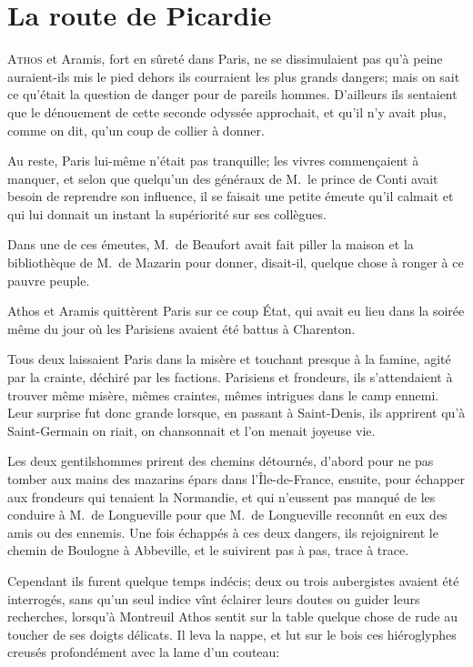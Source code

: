 \chapter{La route de Picardie}

\lettrine{A}{thos} et Aramis, fort en sûreté dans Paris, ne se dissimulaient pas qu'à peine auraient-ils mis le pied dehors ils courraient les plus grands dangers; mais on sait ce qu'était la question de danger pour de pareils hommes. D'ailleurs ils sentaient que le dénouement de cette seconde odyssée approchait, et qu'il n'y avait plus, comme on dit, qu'un coup de collier à donner.

Au reste, Paris lui-même n'était pas tranquille; les vivres commençaient à manquer, et selon que quelqu'un des généraux de M.~le prince de Conti avait besoin de reprendre son influence, il se faisait une petite émeute qu'il calmait et qui lui donnait un instant la supériorité sur ses collègues.

Dans une de ces émeutes, M.~de Beaufort avait fait piller la maison et la bibliothèque de M.~de Mazarin pour donner, disait-il, quelque chose à ronger à ce pauvre peuple.

Athos et Aramis quittèrent Paris sur ce coup État, qui avait eu lieu dans la soirée même du jour où les Parisiens avaient été battus à Charenton.

Tous deux laissaient Paris dans la misère et touchant presque à la famine, agité par la crainte, déchiré par les factions. Parisiens et frondeurs, ils s'attendaient à trouver même misère, mêmes craintes, mêmes intrigues dans le camp ennemi. Leur surprise fut donc grande lorsque, en passant à Saint-Denis, ils apprirent qu'à Saint-Germain on riait, on chansonnait et l'on menait joyeuse vie.

Les deux gentilshommes prirent des chemins détournés, d'abord pour ne pas tomber aux mains des mazarins épars dans l'Île-de-France, ensuite, pour échapper aux frondeurs qui tenaient la Normandie, et qui n'eussent pas manqué de les conduire à M.~de Longueville pour que M.~de Longueville reconnût en eux des amis ou des ennemis. Une fois échappés à ces deux dangers, ils rejoignirent le chemin de Boulogne à Abbeville, et le suivirent pas à pas, trace à trace.

Cependant ils furent quelque temps indécis; deux ou trois aubergistes avaient été interrogés, sans qu'un seul indice vînt éclairer leurs doutes ou guider leurs recherches, lorsqu'à Montreuil Athos sentit sur la table quelque chose de rude au toucher de ses doigts délicats. Il leva la nappe, et lut sur le bois ces hiéroglyphes creusés profondément avec la lame d'un couteau:

